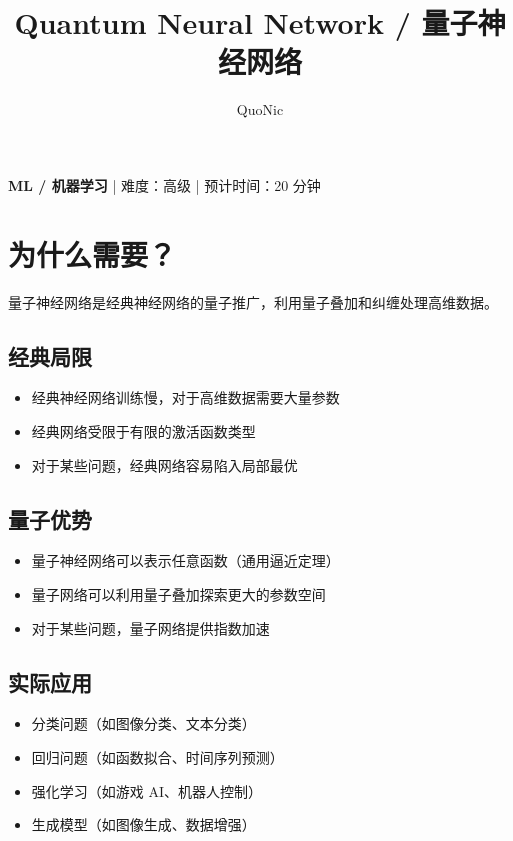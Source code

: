 \documentclass[12pt,a4paper]{article}
\title{Quantum Neural Network / 量子神经网络}
\author{QuoNic}
\date{}
\begin{document}
\maketitle

\begin{center}
\textbf{ML / 机器学习} | 难度：高级 | 预计时间：20 分钟
\end{center}

\tableofcontents
\newpage

\section{为什么需要？}

量子神经网络是经典神经网络的量子推广，利用量子叠加和纠缠处理高维数据。

\subsection{经典局限}
\begin{itemize}
  \item 经典神经网络训练慢，对于高维数据需要大量参数
  \item 经典网络受限于有限的激活函数类型
  \item 对于某些问题，经典网络容易陷入局部最优
\end{itemize}

\subsection{量子优势}
\begin{itemize}
  \item 量子神经网络可以表示任意函数（通用逼近定理）
  \item 量子网络可以利用量子叠加探索更大的参数空间
  \item 对于某些问题，量子网络提供指数加速
\end{itemize}

\subsection{实际应用}
\begin{itemize}
  \item 分类问题（如图像分类、文本分类）
  \item 回归问题（如函数拟合、时间序列预测）
  \item 强化学习（如游戏 AI、机器人控制）
  \item 生成模型（如图像生成、数据增强）
\end{itemize}
\end{document}
